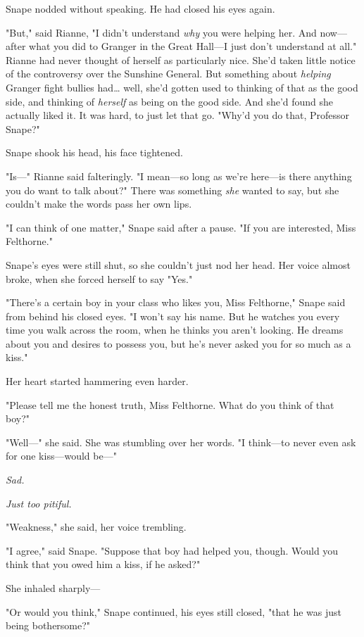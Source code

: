Snape nodded without speaking. He had closed his eyes again.

"But," said Rianne, "I didn't understand \emph{why} you were helping her. And
now---after what you did to Granger in the Great Hall---I just don't understand
at all." Rianne had never thought of herself as particularly nice. She'd taken
little notice of the controversy over the Sunshine General. But something about
\emph{helping} Granger fight bullies had{\ldots} well, she'd gotten used to
thinking of that as the good side, and thinking of \emph{herself} as being on
the good side. And she'd found she actually liked it. It was hard, to just let
that go. "Why'd you do that, Professor Snape?"

Snape shook his head, his face tightened.

"Is---" Rianne said falteringly. "I mean---so long as we're here---is there
anything you do want to talk about?" There was something \emph{she} wanted to
say, but she couldn't make the words pass her own lips.

"I can think of one matter," Snape said after a pause. "If you are interested,
Miss Felthorne."

Snape's eyes were still shut, so she couldn't just nod her head. Her voice
almost broke, when she forced herself to say "Yes."

"There's a certain boy in your class who likes you, Miss Felthorne," Snape said
from behind his closed eyes. "I won't say his name. But he watches you every
time you walk across the room, when he thinks you aren't looking. He dreams
about you and desires to possess you, but he's never asked you for so much as a
kiss."

Her heart started hammering even harder.

"Please tell me the honest truth, Miss Felthorne. What do you think of that
boy?"

"Well---" she said. She was stumbling over her words. "I think---to never even
ask for one kiss---would be---"

\emph{Sad.}

\emph{Just too pitiful.}

"Weakness," she said, her voice trembling.

"I agree," said Snape. "Suppose that boy had helped you, though. Would you
think that you owed him a kiss, if he asked?"

She inhaled sharply---

"Or would you think," Snape continued, his eyes still closed, "that he was just
being bothersome?"

